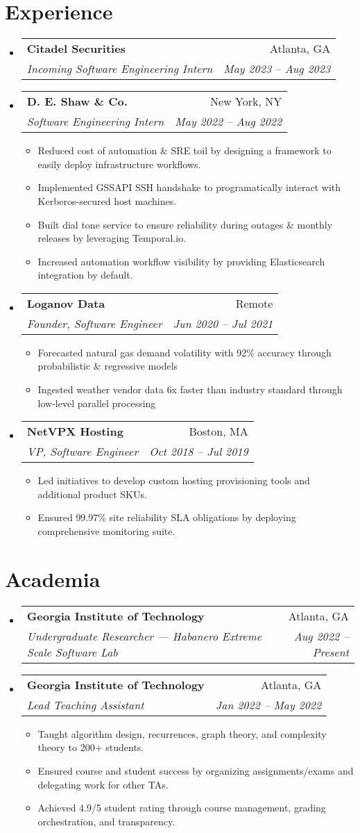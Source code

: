 \documentclass[a4paper,11pt]{extarticle}
\makeatletter
\newcommand{\resumeItem}[1]{
	\item\small{
		#1 \vspace{-1.2pt}
	}
}
\newcommand{\resumeSubheading}[4]{
	\vspace{-1pt}
    \item
		\begin{tabular*}{1\linewidth}{l@{\extracolsep{\fill}}r}
			\textbf{#1} & #2 \\
			\textit{#3} & \textit{#4} \\
		\end{tabular*}\vspace{-2pt}
}
\newcommand{\resumeSubHeadingListStart}{
    \begin{itemize}[leftmargin=0.15in,label={}]}
\newcommand{\resumeSubHeadingListEnd}{\end{itemize}}
\newcommand{\resumeItemListStart}{\begin{itemize}\vspace{-3pt}}
\newcommand{\resumeItemListEnd}{\end{itemize}\vspace{-3pt}}
\makeatother
\begin{document}
\section{Experience}
	\resumeSubHeadingListStart
        \resumeSubheading
            {Citadel Securities}
            {Atlanta, GA}
            {Incoming Software Engineering Intern}
            {May 2023 -- Aug 2023}
        \resumeSubheading
            {D. E. Shaw \& Co.}
            {New York, NY}
            {Software Engineering Intern}
            {May 2022 -- Aug 2022}
		\resumeItemListStart
            \resumeItem{Reduced cost of automation \& SRE toil by
                designing a framework to easily deploy infrastructure
                workflows.}
            \resumeItem{Implemented GSSAPI SSH handshake to programatically
                interact with Kerberos-secured host machines.}
            \resumeItem{Built dial tone service to ensure reliability during
                outages \& monthly releases by leveraging Temporal.io.}
            \resumeItem{Increased automation workflow visibility by providing
                Elasticsearch integration by default.}
		\resumeItemListEnd
		\resumeSubheading
            {Loganov Data}
            {Remote}
		    {Founder, Software Engineer}
            {Jun 2020 -- Jul 2021}
		\resumeItemListStart
			\resumeItem{Forecasted natural gas demand volatility with 92\%
                accuracy through probabilistic \& regressive models}
			\resumeItem{Ingested weather vendor data 6x faster than industry
				standard through low-level parallel processing}
		\resumeItemListEnd
		\resumeSubheading
            {NetVPX Hosting}
            {Boston, MA}
		    {VP, Software Engineer}
            {Oct 2018 -- Jul 2019}
		\resumeItemListStart
			\resumeItem{Led initiatives to develop custom hosting provisioning
				tools and additional product SKUs.}
			\resumeItem{Ensured $99.97$\% site reliability SLA obligations
                by deploying comprehensive monitoring suite.}
		\resumeItemListEnd
	\resumeSubHeadingListEnd

\section{Academia}
	\resumeSubHeadingListStart
        \resumeSubheading
            {Georgia Institute of Technology}
            {Atlanta, GA}
            {Undergraduate Researcher --- Habanero Extreme Scale Software Lab}
            {Aug 2022 -- Present}
        \resumeSubheading
            {Georgia Institute of Technology}
            {Atlanta, GA}
            {Lead Teaching Assistant}
            {Jan 2022 -- May 2022}
		\resumeItemListStart
			\resumeItem{Taught algorithm design, recurrences, graph
            theory, and complexity theory to 200+ students.}
            \resumeItem{Ensured course and student success by organizing 
                assignments/exams and delegating work for other TAs.}
            \resumeItem{Achieved 4.9/5 student rating through course management,
                grading orchestration, and transparency.}
		\resumeItemListEnd
	\resumeSubHeadingListEnd
\end{document}
